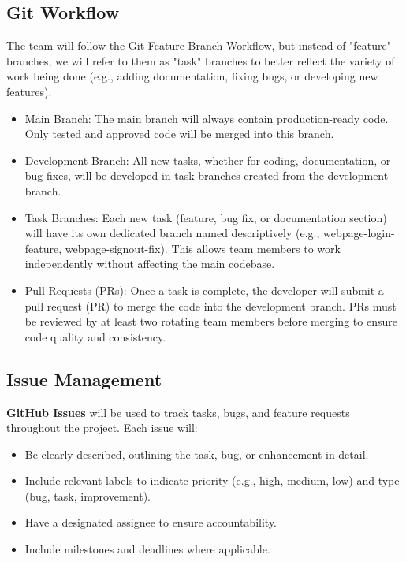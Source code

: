 \documentclass{article}
\begin{document}
\subsection{Git Workflow}
The team will follow the Git Feature Branch Workflow, but instead of "feature" branches, we will refer to them as "task" branches to better reflect the variety of work being done (e.g., adding documentation, fixing bugs, or developing new features).

\begin{itemize}
    \item Main Branch: The main branch will always contain production-ready code. Only tested and approved code will be merged into this branch.
    \item Development Branch: All new tasks, whether for coding, documentation, or bug fixes, will be developed in task branches created from the development branch.
    \item Task Branches: Each new task (feature, bug fix, or documentation section) will have its own dedicated branch named descriptively (e.g., webpage-login-feature, webpage-signout-fix). This allows team members to work independently without affecting the main codebase.
    \item Pull Requests (PRs): Once a task is complete, the developer will submit a pull request (PR) to merge the code into the development branch. PRs must be reviewed by at least two rotating team members before merging to ensure code quality and consistency.
\end{itemize}

\subsection{Issue Management}
\textbf{GitHub Issues} will be used to track tasks, bugs, and feature requests throughout the project. Each issue will:
\begin{itemize}
    \item Be clearly described, outlining the task, bug, or enhancement in detail.
    \item Include relevant labels to indicate priority (e.g., high, medium, low) and type (bug, task, improvement).
    \item Have a designated assignee to ensure accountability.
    \item Include milestones and deadlines where applicable.
\end{itemize}\par
\end{document}
